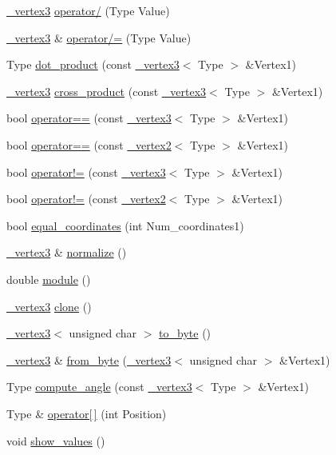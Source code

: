 \begin{DoxyCompactItemize}
\item 
\hyperlink{class__vertex3}{\+\_\+vertex3} \hyperlink{class__vertex3_aad488f670f32737cb2f208de045d65cd}{operator/} (Type Value)
\item 
\hyperlink{class__vertex3}{\+\_\+vertex3} \& \hyperlink{class__vertex3_a5d19243a99f577d5e60a6e0da183f631}{operator/=} (Type Value)
\item 
Type \hyperlink{class__vertex3_a26d4a5a8a843fbbca0142decfbd7aa3a}{dot\+\_\+product} (const \hyperlink{class__vertex3}{\+\_\+vertex3}$<$ Type $>$ \&Vertex1)
\item 
\hyperlink{class__vertex3}{\+\_\+vertex3} \hyperlink{class__vertex3_a023151d44715e39c077498a16058ae1b}{cross\+\_\+product} (const \hyperlink{class__vertex3}{\+\_\+vertex3}$<$ Type $>$ \&Vertex1)
\item 
bool \hyperlink{class__vertex3_a45465b568f9c39581fe1835b64aefa52}{operator==} (const \hyperlink{class__vertex3}{\+\_\+vertex3}$<$ Type $>$ \&Vertex1)
\item 
bool \hyperlink{class__vertex3_a73f12780df97b1cd4efb5eb0e4e4d9b3}{operator==} (const \hyperlink{class__vertex2}{\+\_\+vertex2}$<$ Type $>$ \&Vertex1)
\item 
bool \hyperlink{class__vertex3_a377e570c56a75e993784807feab22975}{operator!=} (const \hyperlink{class__vertex3}{\+\_\+vertex3}$<$ Type $>$ \&Vertex1)
\item 
bool \hyperlink{class__vertex3_ac522603ae44ec5cf2f85870a80060a9f}{operator!=} (const \hyperlink{class__vertex2}{\+\_\+vertex2}$<$ Type $>$ \&Vertex1)
\item 
bool \hyperlink{class__vertex3_ac00adc2ba65ac16522e7d2442a85f476}{equal\+\_\+coordinates} (int Num\+\_\+coordinates1)
\item 
\hyperlink{class__vertex3}{\+\_\+vertex3} \& \hyperlink{class__vertex3_a5dbd551f4cc82dfbfd057db0bcd498d8}{normalize} ()
\item 
double \hyperlink{class__vertex3_adac3faf17643fe853316241d0051a879}{module} ()
\item 
\hyperlink{class__vertex3}{\+\_\+vertex3} \hyperlink{class__vertex3_a48c06f7cf8ca014649361de201aaba7c}{clone} ()
\item 
\hyperlink{class__vertex3}{\+\_\+vertex3}$<$ unsigned char $>$ \hyperlink{class__vertex3_ac533a7d76e85d6849c8de64a24494f0d}{to\+\_\+byte} ()
\item 
\hyperlink{class__vertex3}{\+\_\+vertex3} \& \hyperlink{class__vertex3_aea176587ab25292792895c545c250e21}{from\+\_\+byte} (\hyperlink{class__vertex3}{\+\_\+vertex3}$<$ unsigned char $>$ \&Vertex1)
\item 
Type \hyperlink{class__vertex3_aec67fc9b4ea4ba7e198084c4a7555b83}{compute\+\_\+angle} (const \hyperlink{class__vertex3}{\+\_\+vertex3}$<$ Type $>$ \&Vertex1)
\item 
Type \& \hyperlink{class__vertex3_a9a5dca715628955871e5b8109e397d76}{operator\mbox{[}$\,$\mbox{]}} (int Position)
\item 
void \hyperlink{class__vertex3_a3723d55499e0bbea4f94fe78cf63b831}{show\+\_\+values} ()
\end{DoxyCompactItemize}

